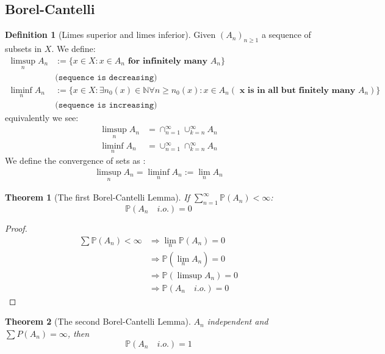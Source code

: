 \documentclass[a4paper,11pt]{book}
\newtheorem{theorem}{Theorem}[section]
\theoremstyle{definition}
\newtheorem{definition}{Definition}[section]
\theoremstyle{remark}
\begin{document}
\subsection{Borel-Cantelli}
\begin{definition}[Limes superior and limes inferior]
	Given $(A_n)_{n \geq 1}$ a sequence of subsets in $X$. We define:
	\begin{align*}
		\limsup_n A_n &:= \{ x \in X: x \in A_n \textbf{ for infinitely many } A_n \}\\
		&\texttt{(sequence is decreasing)}\\
		\liminf_n A_n &:= \{ x \in X: \exists n_0(x) \in \mathbb{N}\forall n \geq n_0(x): x \in A_n ( \textbf{ x is in all but finitely many $A_n$})\}\\
		 &\texttt{(sequence is increasing)}
	\end{align*}
	equivalently we see:
	\begin{align*}
		\limsup_n A_n &= \cap_{n = 1}^\infty \cup_{k = n}^\infty A_n\\ 
		\liminf_n A_n &= \cup_{n = 1}^\infty \cap_{k = n}^\infty A_n
	\end{align*}
	We define the convergence of sets as :
	\begin{align*}
		\limsup_n A_n = \liminf_n A_n := \lim_n A_n
	\end{align*}
\end{definition}
\begin{theorem}[The first Borel-Cantelli Lemma]
	If $\sum_{n = 1}^\infty \mathbb{P}(A_n) < \infty$:
	\begin{equation*}
		\mathbb{P}(A_n \quad i.o.) = 0
	\end{equation*}
\end{theorem}
\begin{proof}
\begin{align*}
	\sum \mathbb{P}(A_n) < \infty &\Rightarrow \lim_n \mathbb{P}(A_n) = 0\\
	&\Rightarrow \mathbb{P}(\lim_n A_n) = 0\\
	&\Rightarrow \mathbb{P}(\limsup A_n) = 0\\
	&\Rightarrow \mathbb{P}(A_n\quad i.o.) = 0 
\end{align*}
\end{proof}

\begin{theorem}[The second Borel-Cantelli Lemma]
	$A_n$ independent and $\sum P(A_n) = \infty$, then
	\begin{equation*}
		\mathbb{P}(A_n \quad i.o.) = 1
	\end{equation*}
\end{theorem}
\end{document}
